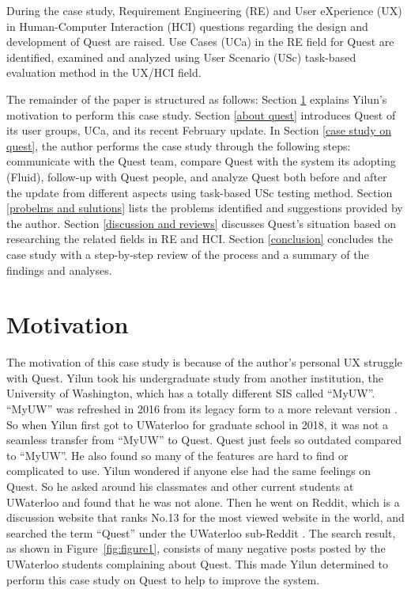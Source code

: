 \documentclass[conference]{IEEEtran}
\begin{document}
During the case study, Requirement Engineering (RE) and User eXperience (UX) in Human-Computer Interaction (HCI) questions regarding the design and development of Quest are raised. Use Cases (UCa) in the RE field for Quest are identified, examined and analyzed using User Scenario (USc) task-based evaluation method in the UX/HCI field.

The remainder of the paper is structured as follows: Section \ref{motivation} explains Yilun's motivation to perform this case study. Section \ref{about quest} introduces Quest of its user groups, UCa, and its recent February update. In Section \ref{case study on quest}, the author performs the case study through the following steps: communicate with the Quest team, compare Quest with the system its adopting (Fluid), follow-up with Quest people, and analyze Quest both before and after the update from different aspects using task-based USc testing method. Section \ref{probelms and sulutions} lists the problems identified and suggestions provided by the author. Section \ref{discussion and reviews} discusses Quest's situation based on researching the related fields in RE and HCI. Section \ref{conclusion} concludes the case study with a step-by-step review of the process and a summary of the findings and analyses.  

\section{Motivation} \label{motivation}
The motivation of this case study is because of the author's personal UX struggle with Quest. Yilun took his undergraduate study from another institution, the University of Washington, which has a totally different SIS called ``MyUW''. ``MyUW'' was refreshed in 2016 from its legacy form to a more relevant version \cite{b2}. So when Yilun first got to UWaterloo for graduate school in 2018, it was not a seamless transfer from ``MyUW'' to Quest. Quest just feels so outdated compared to ``MyUW''. He also found so many of the features are hard to find or complicated to use. Yilun wondered if anyone else had the same feelings on Quest. So he asked around his classmates and other current students at UWaterloo and found that he was not alone. Then he went on Reddit, which is a discussion website that ranks No.13 for the most viewed website in the world, and searched the term ``Quest'' under the UWaterloo sub-Reddit \cite{b3}. The search result, as shown in Figure~\ref{fig:figure1}, consists of many negative posts posted by the UWaterloo students complaining about Quest. This made Yilun determined to perform this case study on Quest to help to improve the system.
\end{document}

